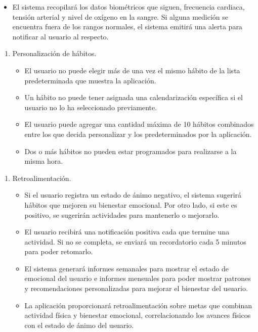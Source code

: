 \documentclass[letterpaper,12pt,oneside]{article}
\begin{document}
\begin{enumerate}
\begin{itemize}
                        \item El sistema recopilará los datos biométricos que siguen, frecuencia cardiaca, tensión arterial y nivel de oxígeno en la sangre. Si alguna medición se encuentra fuera de los rangos normales, el sistema emitirá una alerta para notificar al usuario al respecto.
                    \end{itemize}
            \end{enumerate}
            \begin{enumerate}
                \item Personalización de hábitos.
                \begin{itemize}
                    \item El usuario no puede elegir más de una vez el mismo hábito de la lista predeterminada que muestra la aplicación.
                    \item Un hábito no puede tener asignada una calendarización específica si el usuario no lo ha seleccionado previamente.
                    \item El usuario puede agregar una cantidad máxima de 10 hábitos combinados entre los que decida personalizar y los predeterminados por la aplicación.
                    \item Dos o más hábitos no pueden estar programados para realizarse a la misma hora.
                \end{itemize}
            \end{enumerate}
            \begin{enumerate}
                \item Retroalimentación.
                \begin{itemize}
                    \item Si el usuario registra un estado de ánimo negativo, el sistema sugerirá hábitos que mejoren su bienestar emocional. Por otro lado, si este es positivo, se sugerirán actividades para mantenerlo o mejorarlo.
                    \item El usuario recibirá una notificación positiva cada que termine una actividad. Si no se completa, se enviará un recordatorio cada 5 minutos para poder retomarlo.
                    \item El sistema generará informes semanales para mostrar el estado de emocional del usuario e informes mensuales para poder mostrar patrones y recomendaciones personalizadas para mejorar el bienestar del usuario.
                    \item La aplicación proporcionará retroalimentación sobre metas que combinan actividad física y bienestar emocional, correlacionando los avances físicos con el estado de ánimo del usuario.
                \end{itemize}
            \end{enumerate}
\end{document}
